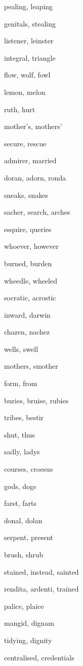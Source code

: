     \item pealing, leaping
    \item genitals, stealing
    \item listener, leinster
    \item integral, triangle
    \item flow, wolf, fowl
    \item lemon, melon
    \item ruth, hurt
    \item mother's, mothers'
    \item secure, rescue
    \item admirer, married
    \item doran, adorn, ronda
    \item sneaks, snakes
    \item sacher, search, arches
    \item esquire, queries
    \item whoever, however
    \item burned, burden
    \item wheedle, wheeled
    \item socratic, acrostic
    \item inward, darwin
    \item chazen, nachez
    \item wells, swell
    \item mothers, smother
    \item form, from
    \item buries, bruise, rubies
    \item tribes, bestir
    \item shut, thus
    \item sadly, ladys
    \item courses, croesus
    \item gods, dogs
    \item farst, farts
    \item donal, dolan
    \item serpent, present
    \item brush, shrub
    \item stained, instead, sainted
    \item rendita, ardenti, trained
    \item palice, plaice
    \item mangid, dignam
    \item tidying, dignity
    \item centralised, credentials
